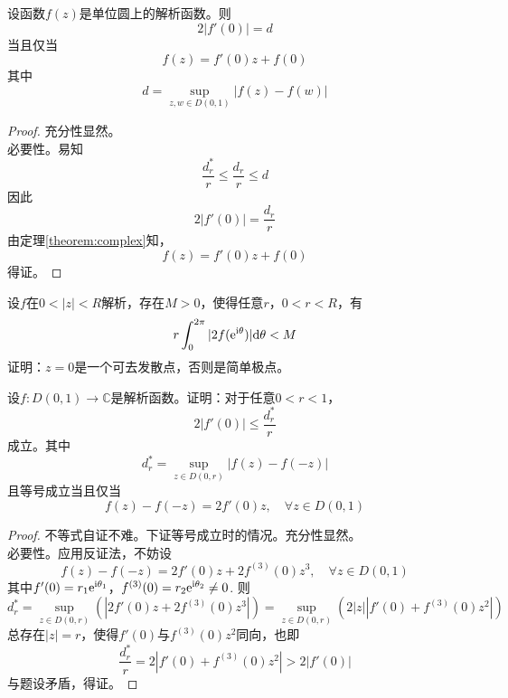 \begin{theorem}

    设函数$f(z)$是单位圆上的解析函数。则
    \[2|f'(0)| = d\]
    当且仅当
    \[f(z) = f'(0)z + f(0)\]
    其中
    \[d = \sup\limits_{z, w \in D(0, 1)}{|f(z) - f(w)|}\]
    
\end{theorem}

\begin{proof}

    充分性显然。\\
    必要性。易知
    \[\dfrac{d_r^{*}}{r} \leq \dfrac{d_r}{r} \leq d\]
    因此
    \[2|f'(0)| = \dfrac{d_r}{r}\]
    由定理\ref{theorem:complex}知，
    \[f(z) = f'(0)z + f(0)\]
    得证。

\end{proof}

\begin{proposition}
    
    设$f$在$0 < |z| < R$解析，存在$M > 0$，使得任意$r$，$0 < r < R$，有
    \[r \int_{0}^{2 \pi}{|2f(\mathrm{e^{i\theta}})|}\mathrm{d} \theta < M\]
    证明：$z = 0$是一个可去发散点，否则是简单极点。

\end{proposition}

\begin{proposition}

    设$f : D(0, 1) \to \mathbb{C}$是解析函数。证明：对于任意$0 < r < 1$，
    \[2|f'(0)| \leq \dfrac{d_r^{*}}{r}\]
    成立。其中
    \[d_r^{*} = \sup\limits_{z \in D(0, r)}{|f(z) - f(-z)|}\]
    且等号成立当且仅当
    \[f(z) - f(-z) = 2f'(0)z, \quad \forall z \in D(0, 1)\]

\end{proposition}

\begin{proof}

    不等式自证不难。下证等号成立时的情况。充分性显然。\\
    必要性。应用反证法，不妨设
    \[f(z) - f(-z) = 2f'(0)z + 2f^{(3)}(0)z^3, \quad \forall z \in D(0, 1)\]
    其中$f'(0) = r_1\mathrm{e}^{\mathrm{i} \theta_1}$，$f^{(3)}(0) = r_2\mathrm{e}^{\mathrm{i} \theta_2} \neq 0$. 则
    \[d_r^{*} = \sup\limits_{z \in D(0, r)}{(|2f'(0)z + 2f^{(3)}(0)z^3|)} = \sup\limits_{z \in D(0, r)}{(2|z||f'(0) + f^{(3)}(0)z^2|)}\]
    总存在$|z| = r$，使得$f'(0)$与$f^{(3)}(0)z^2$同向，也即
    \[\dfrac{d_r^{*}}{r} = 2|f'(0) + f^{(3)}(0)z^2| > 2|f'(0)|\]
    与题设矛盾，得证。

\end{proof}

